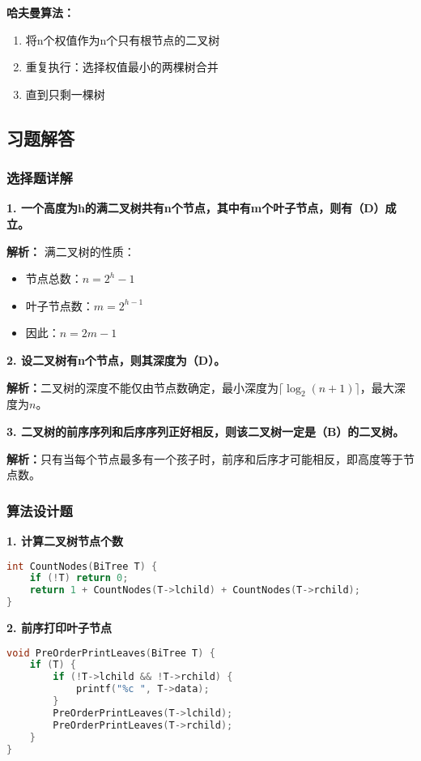\documentclass[12pt,a4paper]{amsart}
\begin{document}
\textbf{哈夫曼算法：}
\begin{enumerate}
\item 将n个权值作为n个只有根节点的二叉树
\item 重复执行：选择权值最小的两棵树合并
\item 直到只剩一棵树
\end{enumerate}

\subsection{习题解答}

\subsubsection{选择题详解}

\textbf{1. 一个高度为h的满二叉树共有n个节点，其中有m个叶子节点，则有（D）成立。}

\textbf{解析：}
满二叉树的性质：
\begin{itemize}
\item 节点总数：$n = 2^h - 1$
\item 叶子节点数：$m = 2^{h-1}$
\item 因此：$n = 2m - 1$
\end{itemize}

\textbf{2. 设二叉树有n个节点，则其深度为（D）。}

\textbf{解析：}二叉树的深度不能仅由节点数确定，最小深度为$\lceil \log_2(n+1) \rceil$，最大深度为$n$。

\textbf{3. 二叉树的前序序列和后序序列正好相反，则该二叉树一定是（B）的二叉树。}

\textbf{解析：}只有当每个节点最多有一个孩子时，前序和后序才可能相反，即高度等于节点数。

\subsubsection{算法设计题}

\textbf{1. 计算二叉树节点个数}

\begin{lstlisting}[language=C++]
int CountNodes(BiTree T) {
    if (!T) return 0;
    return 1 + CountNodes(T->lchild) + CountNodes(T->rchild);
}
\end{lstlisting}

\textbf{2. 前序打印叶子节点}

\begin{lstlisting}[language=C++]
void PreOrderPrintLeaves(BiTree T) {
    if (T) {
        if (!T->lchild && !T->rchild) {
            printf("%c ", T->data);
        }
        PreOrderPrintLeaves(T->lchild);
        PreOrderPrintLeaves(T->rchild);
    }
}
\end{lstlisting}
\end{document}
